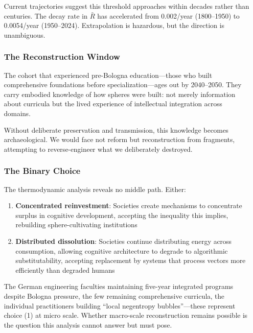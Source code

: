 Current trajectories suggest this threshold approaches within decades rather than centuries. The decay rate in $\bar{R}$ has accelerated from 0.002/year (1800--1950) to 0.0054/year (1950--2024). Extrapolation is hazardous, but the direction is unambiguous.

\subsubsection{The Reconstruction Window}

The cohort that experienced pre-Bologna education---those who built comprehensive foundations before specialization---ages out by 2040--2050. They carry embodied knowledge of how spheres were built: not merely information about curricula but the lived experience of intellectual integration across domains.

Without deliberate preservation and transmission, this knowledge becomes archaeological. We would face not reform but reconstruction from fragments, attempting to reverse-engineer what we deliberately destroyed.

\subsubsection{The Binary Choice}

The thermodynamic analysis reveals no middle path. Either:

\begin{enumerate}
    \item \textbf{Concentrated reinvestment}: Societies create mechanisms to concentrate surplus in cognitive development, accepting the inequality this implies, rebuilding sphere-cultivating institutions
    
    \item \textbf{Distributed dissolution}: Societies continue distributing energy across consumption, allowing cognitive architecture to degrade to algorithmic substitutability, accepting replacement by systems that process vectors more efficiently than degraded humans
\end{enumerate}

The German engineering faculties maintaining five-year integrated programs despite Bologna pressure, the few remaining comprehensive curricula, the individual practitioners building ``local negentropy bubbles''---these represent choice (1) at micro scale. Whether macro-scale reconstruction remains possible is the question this analysis cannot answer but must pose.

